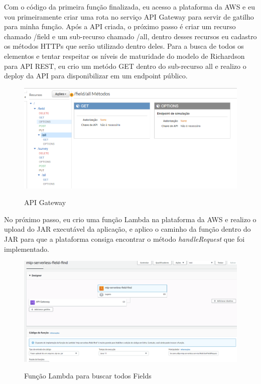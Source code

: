 Com o código da primeira função finalizada, eu acesso a plataforma da AWS e eu vou primeiramente criar uma rota no serviço API Gateway para servir de gatilho para minha função. Após a API criada, o próximo passo é criar um recurso chamado /field e um sub-recurso chamado /all, dentro desses recursos eu cadastro os métodos HTTPs que serão utilizado dentro deles. Para a busca de todos os elementos e tentar respeitar os níveis de maturidade do modelo de Richardson para API REST, eu crio um metódo GET dentro do sub-recurso all e realizo o deploy da API para disponibilizar em um endpoint público.

\begin{figure}[!htb]
	\centering
	\caption{API Gateway}
	\includegraphics[width=1\textwidth,height=0.4\textheight]{./dados/figuras/api-gateway}
	\label{fig:api-gateway}
\end{figure}

No próximo passo, eu crio uma função Lambda na plataforma da AWS e realizo o upload do JAR executável da aplicação, e aplico o caminho da função dentro do JAR para que a plataforma consiga encontrar o método \textit{handleRequest} que foi implementado.

\begin{figure}[!htb]
	\centering
	\caption{Função Lambda para buscar todos Fields}
	\includegraphics[width=1\textwidth,height=0.5\textheight]{./dados/figuras/lambda-field-get}
	\label{fig:lambda-field-get}
\end{figure}

